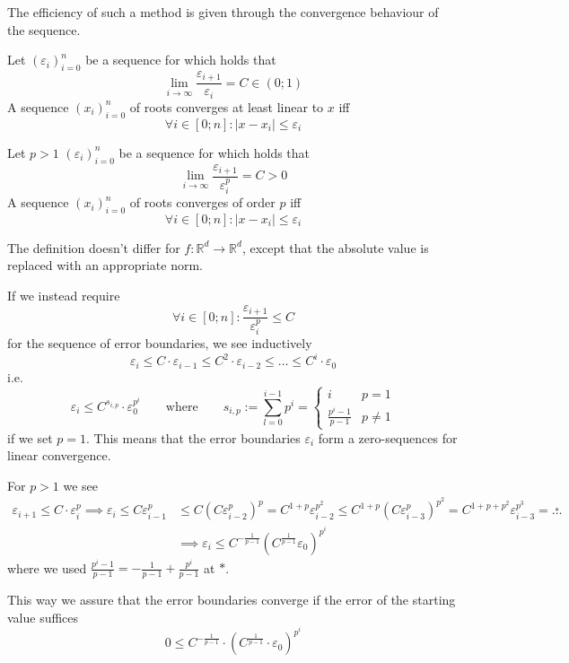 The efficiency of such a method is given through the convergence behaviour of the sequence.
\begin{definition}
   Let \((\varepsilon_i)_{i=0}^n\) be a sequence for which holds that
   \[\lim_{i \to \infty} \frac{\varepsilon_{i+1}}{\varepsilon_i} = C \in (0; 1)\]
   A sequence \((x_i)_{i=0}^n\) of roots converges at least linear to \(x\) iff
   \[\forall i \in [0;n]: |x - x_i| \leq \varepsilon_i\]
\end{definition}
\begin{definition}\label{def:conv_ord_p}
   Let \(p > 1\) \((\varepsilon_i)_{i=0}^n\) be a sequence for which holds that
   \[\lim_{i \to \infty} \frac{\varepsilon_{i+1}}{\varepsilon_i^p} = C > 0\]
   A sequence \((x_i)_{i=0}^n\) of roots converges of order \(p\) iff
   \[\forall i \in [0;n]: |x - x_i| \leq \varepsilon_i\]
\end{definition}
\begin{remark}
   The definition doesn't differ for \(f: \mathbb{R}^d \to \mathbb{R}^d\), except that the absolute value is replaced with an appropriate norm.
\end{remark}
\begin{remark}
   If we instead require
   \[\forall i \in [0;n]: \frac{\varepsilon_{i+1}}{\varepsilon_i^p} \leq C\]
   for the sequence of error boundaries, we see inductively
   \[\varepsilon_i \leq C \cdot \varepsilon_{i-1} \leq C^2 \cdot \varepsilon_{i-2} \leq \ldots \leq C^i \cdot \varepsilon_0\]
   i.e.
   \[\varepsilon_i \leq C^{s_{i,p}} \cdot \varepsilon_0^{p^i} \qquad\text{where}\qquad s_{i,p} := \sum_{l = 0}^{i-1} p^i = \begin{cases}i & p = 1\\ \frac{p^i - 1}{p - 1} & p \neq 1\end{cases}\]
   if we set \(p = 1\).
   This means that the error boundaries \(\varepsilon_i\) form a zero-sequences for linear convergence.

   For \(p > 1\) we see
   \begin{equation*}
      \begin{split}
         \varepsilon_{i+1} \leq C \cdot \varepsilon_i^p \implies \varepsilon_i \leq C \varepsilon_{i-1}^p & \leq C(C \varepsilon_{i-2}^p)^p = C^{1+p} \varepsilon_{i-2}^{p^2} \leq C^{1+p}(C \varepsilon_{i-3}^p)^{p^2} = C^{1+p+p^2} \varepsilon_{i-3}^{p^3} = \overset{\ast}{\ldots} \\
                                                                                                          & \implies \varepsilon_i \leq C^{-\frac{1}{p-1}} \left(C^\frac{1}{p-1} \varepsilon_0\right)^{p^i}
      \end{split}
   \end{equation*}
   where we used \(\frac{p^i - 1}{p-1} = -\frac{1}{p-1} + \frac{p^i}{p-1}\) at \(\ast\).

   This way we assure that the error boundaries converge if the error of the starting value suffices
   \[0 \leq C^{-\frac{1}{p-1}} \cdot \left(C^{\frac{1}{p-1}} \cdot \varepsilon_0\right)^{p^i}\]
\end{remark}

